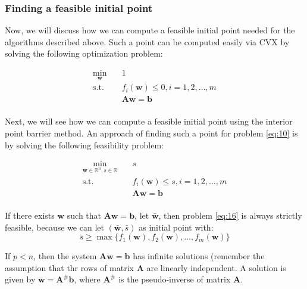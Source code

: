 \documentclass{beamer}
\begin{document}
\begin{frame}

\frametitle{\textbf{Finding a feasible initial point}}

\justifying
Now, we will discuss how we can compute a feasible initial point needed for the algorithms described above. Such a point can be computed easily via CVX by solving the following optimization problem:

\justifying
\begin{equation}
\begin{aligned}
\label{eq:15}
\min_{\mathbf{w}} \quad & {1} \\
\textrm{s.t.} \quad & f_{i}\left(\mathbf{w}\right) \leq 0, i=1,2,\dots,m\\
                             & \mathbf{A}\mathbf{w} = \mathbf{b}\\
\end{aligned}
\end{equation}

\vspace{0.4cm}
\justifying
Next, we will see how we can compute a feasible initial point using the interior point barrier method. An approach of finding such a point for problem \eqref{eq:10} is by solving the following feasibility problem:

\justifying
\begin{equation}
\begin{aligned}
\label{eq:16}
\min_{\mathbf{w} \in \mathbb{R}^{n},s \in \mathbb{R}} \quad & {s} \\
\textrm{s.t.} \quad & f_{i}\left(\mathbf{w}\right) \leq s, i=1,2,\dots,m\\
                             & \mathbf{A}\mathbf{w} = \mathbf{b}\\
\end{aligned}
\end{equation}



\end{frame}






\begin{frame}

\justifying
If there exists $\mathbf{w}$ such that $\mathbf{A}\mathbf{w} = \mathbf{b}$, let $\mathbf{\bar{w}}$, then problem \eqref{eq:16} is always strictly feasible, because we can let $\left(\mathbf{\bar{w}},\bar{s}\right)$ as initial point with:
$$\bar{s} \geq \max\{f_{1}\left(\mathbf{w}\right), f_{2}\left(\mathbf{w}\right), \dots, f_{m}\left(\mathbf{w}\right) \}$$

\vspace{0.8cm}
\justifying
If $p < n$, then the system $\mathbf{A}\mathbf{w} = \mathbf{b}$ has infinite solutions (remember the assumption that thr rows of matrix $\mathbf{A}$ are linearly independent. A solution is given by $\mathbf{\bar{w}} = \mathbf{A}^{\#}\mathbf{b}$, where $ \mathbf{A}^{\#}$ is the pseudo-inverse of matrix $\mathbf{A}$.

\end{frame}
\end{document}
